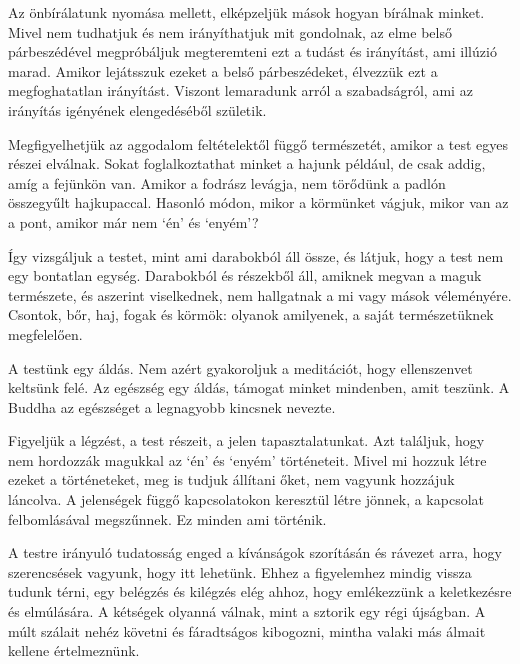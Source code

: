 Az önbírálatunk nyomása mellett, elképzeljük mások hogyan bírálnak
minket. Mivel nem tudhatjuk és nem irányíthatjuk mit gondolnak, az elme
belső párbeszédével megpróbáljuk megteremteni ezt a tudást és
irányítást, ami illúzió marad. Amikor lejátsszuk ezeket a belső
párbeszédeket, élvezzük ezt a megfoghatatlan irányítást. Viszont
lemaradunk arról a szabadságról, ami az irányítás igényének
elengedéséből születik.


Megfigyelhetjük az aggodalom feltételektől függő természetét, amikor a
test egyes részei elválnak. Sokat foglalkoztathat minket a hajunk
például, de csak addig, amíg a fejünkön van. Amikor a fodrász levágja,
nem törődünk a padlón összegyűlt hajkupaccal. Hasonló módon, mikor a
körmünket vágjuk, mikor van az a pont, amikor már nem `én' és `enyém'?

Így vizsgáljuk a testet, mint ami darabokból áll össze, és látjuk, hogy
a test nem egy bontatlan egység. Darabokból és részekből áll, amiknek
megvan a maguk természete, és aszerint viselkednek, nem hallgatnak a mi
vagy mások véleményére. Csontok, bőr, haj, fogak és körmök: olyanok
amilyenek, a saját természetüknek megfelelően.

\clearpage

A testünk egy áldás. Nem azért gyakoroljuk a meditációt, hogy
ellenszenvet keltsünk felé. Az egészség egy áldás, támogat minket
mindenben, amit teszünk. A Buddha az egészséget a legnagyobb kincsnek
nevezte.


Figyeljük a légzést, a test részeit, a jelen tapasztalatunkat. Azt
találjuk, hogy nem hordozzák magukkal az `én' és `enyém' történeteit.
Mivel mi hozzuk létre ezeket a történeteket, meg is tudjuk állítani
őket, nem vagyunk hozzájuk láncolva. A jelenségek függő kapcsolatokon
keresztül létre jönnek, a kapcsolat felbomlásával megszűnnek. Ez minden
ami történik.

A testre irányuló tudatosság enged a kívánságok szorításán és rávezet
arra, hogy szerencsések vagyunk, hogy itt lehetünk. Ehhez a figyelemhez
mindig vissza tudunk térni, egy belégzés és kilégzés elég ahhoz, hogy
emlékezzünk a keletkezésre és elmúlására. A kétségek olyanná válnak,
mint a sztorik egy régi újságban. A múlt szálait nehéz követni és
fáradtságos kibogozni, mintha valaki más álmait kellene értelmeznünk.

